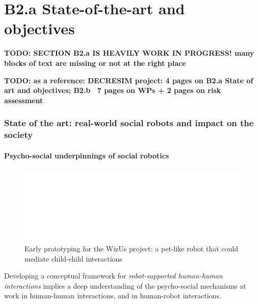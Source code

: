 \documentclass[11pt,a4paper]{report}
\newcommand{\project}{WizUs\xspace}
\newcommand{\TODO}[1]{{\color{red}\textbf{TODO: #1}}}
\newcommand{\eu}[1]{}
\begin{document}
\chapter{B2.a State-of-the-art and objectives}

\TODO{SECTION B2.a IS HEAVILY WORK IN PROGRESS! many blocks of text are missing
or not at the right place}


\eu{(B2.a, B2.b, B2.c: max 15 pages (2 pages for B2.c)}
\eu{Specify the proposal objectives in the context of the state
of the art in the research field. It should be clear how and why the proposed work is important for
the field, and what impact it will have if successful, such as how it may open up new horizons or
opportunities for science, technology or scholarship. Specify any particularly challenging or
unconventional aspects of the proposal, including multi- or inter-disciplinary aspects.}

\TODO{as a reference: DECRESIM project: 4 pages on B2.a State of art and
objectives; B2.b ~7 pages on WPs + 2 pages on risk assessment}




\subsection{State of the art: real-world social robots and impact on the
society}



\subsubsection{Psycho-social underpinnings of social robotics}

\begin{figure}
    \centering
    \includegraphics[width=0.9\linewidth]{figs/wizme+dolls}
    \caption{Early prototyping for the \project project: a pet-like robot that could
    mediate child-child interactions}
    \label{}
\end{figure}


Developing a conceptual framework for \emph{robot-supported human-human
interactions} implies a deep understanding of the psycho-social mechanisms at
work in human-human interactions, and in human-robot interactions.
\end{document}
